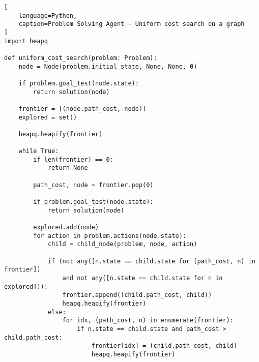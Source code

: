 \begin{lstlisting}[
    language=Python,
    caption=Problem Solving Agent - Uniform cost search on a graph
]
import heapq

def uniform_cost_search(problem: Problem):
    node = Node(problem.initial_state, None, None, 0)

    if problem.goal_test(node.state):
        return solution(node)
    
    frontier = [(node.path_cost, node)]
    explored = set()

    heapq.heapify(frontier)

    while True:
        if len(frontier) == 0:
            return None
        
        path_cost, node = frontier.pop(0)

        if problem.goal_test(node.state):
            return solution(node)

        explored.add(node)
        for action in problem.actions(node.state):
            child = child_node(problem, node, action)

            if (not any([n.state == child.state for (path_cost, n) in frontier])
                and not any([n.state == child.state for n in explored])):
                frontier.append((child.path_cost, child))
                heapq.heapify(frontier)
            else:
                for idx, (path_cost, n) in enumerate(frontier):
                    if n.state == child.state and path_cost > child.path_cost:
                        frontier[idx] = (child.path_cost, child)
                        heapq.heapify(frontier)
\end{lstlisting}





